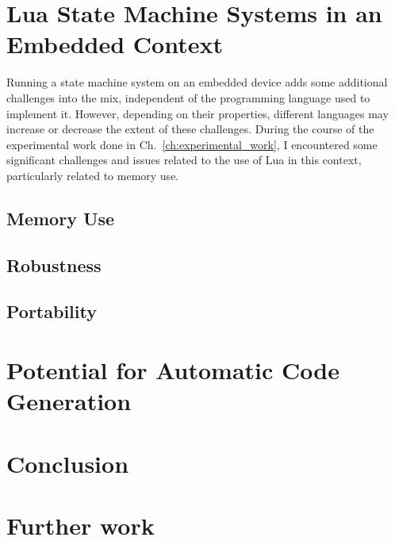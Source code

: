\section{Lua State Machine Systems in an Embedded Context}
\label{sec:disq_lua_embedded}
Running a state machine system on an embedded device adds some additional challenges into the mix, independent of the programming language used to implement it. However, depending on their properties, different languages may increase or decrease the extent of these challenges. During the course of the experimental work done in Ch.~\ref{ch:experimental_work}, I encountered some significant challenges and issues related to the use of Lua in this context, particularly related to memory use.

\subsection{Memory Use}
\label{sec:disq_memory_use}


\subsection{Robustness}
\label{sec:disq_robust}

\subsection{Portability}
\label{sec:disq_portability}

\section{Potential for Automatic Code Generation}
\label{sec:disq_automatic_code}

\section{Conclusion}
\label{sec:conclusion}

\section{Further work}
\label{sec:further_work}